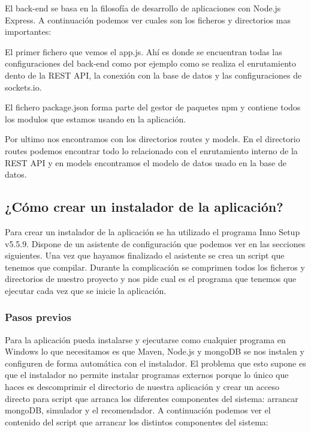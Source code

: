 El back-end se basa en la filosofía de desarrollo de aplicaciones con Node.js  Express. A continuación podemos ver cuales son los ficheros y directorios mas importantes:


El primer fichero que vemos el app.js. Ahí es donde se encuentran todas las configuraciones del back-end como por ejemplo como se realiza el enrutamiento dento de la REST API, la conexión con la base de datos y las configuraciones de sockets.io.

El fichero package.json forma parte del gestor de paquetes npm y contiene todos los modulos que estamos usando en la aplicación. 

Por ultimo nos encontramos con los directorios routes y models. En el directorio routes podemos encontrar todo lo relacionado con el enrutamiento interno de la REST API y en models encontramos el modelo de datos usado en la base de datos.

\subsection{¿Cómo crear un instalador de la aplicación?}

Para crear un instalador de la aplicación se ha utilizado el programa Inno Setup v5.5.9. Dispone de un asistente de configuración que podemos ver en las secciones siguientes. Una vez que hayamos finalizado el asistente se crea un script que tenemos que compilar. Durante la complicación se comprimen todos los ficheros y directorios de nuestro proyecto y nos pide cual es el programa que tenemos que ejecutar cada vez que se inicie la aplicación.

\subsubsection{Pasos previos}

Para la aplicación pueda instalarse y ejecutarse como cualquier programa en Windows lo que necesitamos es que Maven, Node.js y mongoDB se nos instalen y configuren de forma automática con el instalador. El problema que esto supone es que el instalador no permite instalar programas externos porque lo único que haces es descomprimir el directorio de nuestra aplicación y crear un acceso directo para script que arranca los diferentes componentes del sistema: arrancar mongoDB, simulador y el recomendador. A continuación podemos ver el contenido del script que arrancar los distintos componentes del sistema:

